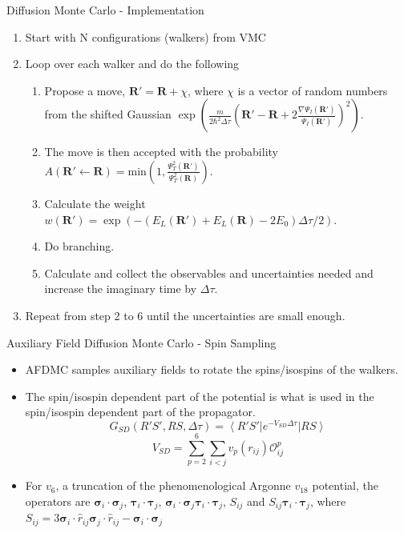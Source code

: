 \documentclass{beamer}
\newcommand{\ket}[1]{\left| #1 \right>}
\newcommand{\bra}[1]{\left< #1 \right|}
\newcommand{\Opij}{\mathcal{O}_{ij}^p}
\newcommand{\R}{\mathbf{R}}
\newcommand{\dt}{\Delta\tau}
\newcommand{\ti}{\bm{\tau}_i}
\newcommand{\tj}{\bm{\tau}_j}
\newcommand{\si}{\bm{\sigma}_i}
\newcommand{\sj}{\bm{\sigma}_j}
\begin{document}
\begin{frame}{Diffusion Monte Carlo - Implementation}
\begin{enumerate}
   \item Start with N configurations (walkers) from VMC
   \item Loop over each walker and do the following
   \begin{enumerate}
      \setlength\itemsep{0.2em}
      \item Propose a move, $\R' = \R + \chi$, where $\chi$ is a vector of random numbers from the shifted Gaussian $\exp\left(\frac{m}{2\hbar^2\Delta\tau}\left(\R'-\R+2\frac{\nabla\Psi_I(\R')}{\Psi_I(\R')}\right)^2\right)$.
      \item The move is then accepted with the probability $A(\R'\leftarrow\R)=\mathrm{min}\left(1,\frac{\Psi_T^2(\R')}{\Psi_T^2(\R)}\right)$.
      \item Calculate the weight $w(\R')=\exp\left(-\left(E_L(\R')+E_L(\R)-2E_0\right)\Delta\tau/2\right)$.
      \item Do branching.
      \item Calculate and collect the observables and uncertainties needed and increase the imaginary time by $\Delta\tau$.
   \end{enumerate}
   \item Repeat from step 2 to 6 until the uncertainties are small enough.
\end{enumerate}
\end{frame}

\begin{frame}{Auxiliary Field Diffusion Monte Carlo - Spin Sampling}
\begin{itemize}
   \item AFDMC samples auxiliary fields to rotate the spins/isospins of the walkers.
   \item The spin/isospin dependent part of the potential is what is used in the spin/isospin dependent part of the propagator.
   \begin{equation*}
      G_{SD}(R'S',RS,\dt) = \bra {R'S'}e^{-V_{SD}\dt} \ket{RS}
   \end{equation*}
   \begin{equation*}
      V_{SD} = \sum\limits_{p=2}^6\sum\limits_{i<j}v_p(r_{ij})\Opij
   \end{equation*}
   \item For $v_6$, a truncation of the phenomenological Argonne $v_{18}$ potential, the operators are $\si\cdot\sj$, $\ti\cdot\tj$, $\si\cdot\sj \ti\cdot\tj$, $S_{ij}$ and $S_{ij} \ti\cdot\tj$, where $S_{ij} = 3\si\cdot\hat{r}_{ij}\sj\cdot\hat{r}_{ij}-\si\cdot\sj$
\end{itemize}
\end{frame}
\end{document}
